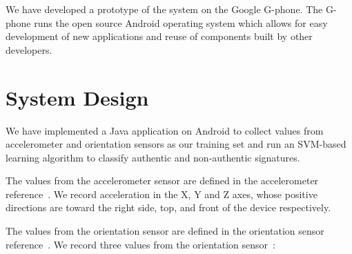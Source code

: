 \documentclass[12pt]{article}
\begin{document}
We have developed a prototype of the system on the Google G-phone. The G-phone runs the open source Android operating system which allows for easy development of new applications and reuse of components built by other developers.

\section{System Design}

We have implemented a Java application on Android to collect values from accelerometer and orientation sensors as our training set and run an SVM-based learning algorithm to classify authentic and non-authentic signatures.

The values from the accelerometer sensor are defined in the accelerometer reference~\cite{accelerometer}. We record acceleration in the X, Y and Z axes, whose positive directions are toward the right side, top, and front of the device respectively.

The values from the orientation sensor are defined in the orientation sensor reference~\cite{orientation}.
We record three values from the orientation sensor~\cite{orient1}:
\end{document}

